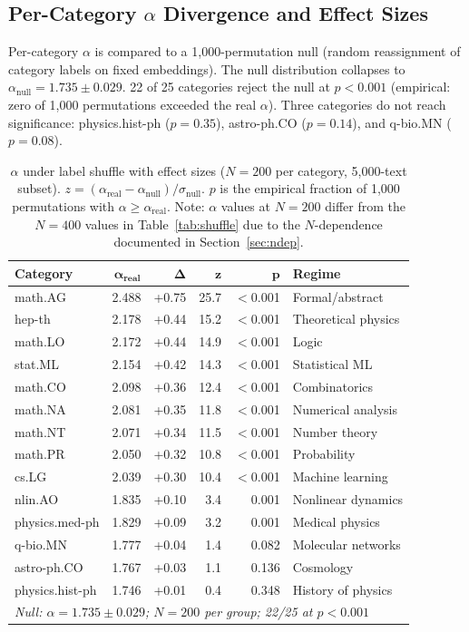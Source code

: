 \documentclass[12pt,letterpaper]{article}
\newcommand{\al}{\alpha}
\begin{document}
\subsection{Per-Category $\al$ Divergence and Effect Sizes}
\label{sec:label_shuffle}

Per-category $\al$ is compared to a 1{,}000-permutation null
(random reassignment of category labels on fixed embeddings).
The null distribution collapses to $\al_{\text{null}} = 1.735
\pm 0.029$.  22 of 25 categories reject the null at $p < 0.001$
(empirical: zero of 1{,}000 permutations exceeded the real $\al$).
Three categories do not reach significance: physics.hist-ph
($p = 0.35$), astro-ph.CO ($p = 0.14$), and q-bio.MN ($p = 0.08$).

\begin{table}[H]
\centering
\caption{$\al$ under label shuffle with effect sizes ($N = 200$
per category, 5{,}000-text subset).
$z = (\al_{\text{real}} - \al_{\text{null}}) / \sigma_{\text{null}}$.
$p$ is the empirical fraction of 1{,}000 permutations with
$\al \geq \al_{\text{real}}$.  Note: $\al$ values at $N = 200$
differ from the $N = 400$ values in Table~\ref{tab:shuffle} due
to the $N$-dependence documented in Section~\ref{sec:ndep}.}
\label{tab:null_alpha}
\begin{tabular}{lrrrrl}
\toprule
\textbf{Category} & $\boldsymbol{\al_{\text{real}}}$ &
$\boldsymbol{\Delta}$ & $\boldsymbol{z}$ & $\boldsymbol{p}$ &
\textbf{Regime} \\
\midrule
math.AG & 2.488 & +0.75 & 25.7 & $<$0.001 & Formal/abstract \\
hep-th & 2.178 & +0.44 & 15.2 & $<$0.001 & Theoretical physics \\
math.LO & 2.172 & +0.44 & 14.9 & $<$0.001 & Logic \\
stat.ML & 2.154 & +0.42 & 14.3 & $<$0.001 & Statistical ML \\
math.CO & 2.098 & +0.36 & 12.4 & $<$0.001 & Combinatorics \\
math.NA & 2.081 & +0.35 & 11.8 & $<$0.001 & Numerical analysis \\
math.NT & 2.071 & +0.34 & 11.5 & $<$0.001 & Number theory \\
math.PR & 2.050 & +0.32 & 10.8 & $<$0.001 & Probability \\
cs.LG & 2.039 & +0.30 & 10.4 & $<$0.001 & Machine learning \\
\midrule
nlin.AO & 1.835 & +0.10 & 3.4 & 0.001 & Nonlinear dynamics \\
physics.med-ph & 1.829 & +0.09 & 3.2 & 0.001 & Medical physics \\
q-bio.MN & 1.777 & +0.04 & 1.4 & 0.082 & Molecular networks \\
astro-ph.CO & 1.767 & +0.03 & 1.1 & 0.136 & Cosmology \\
physics.hist-ph & 1.746 & +0.01 & 0.4 & 0.348 & History of physics \\
\midrule
\multicolumn{6}{l}{\textit{Null: $\al = 1.735 \pm 0.029$;
$N = 200$ per group; 22/25 at $p < 0.001$}} \\
\bottomrule
\end{tabular}
\end{table}
\end{document}
